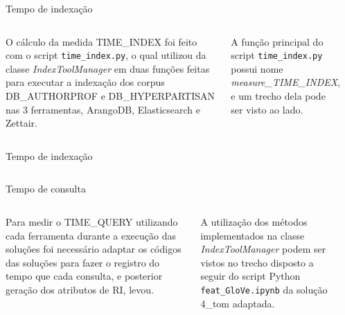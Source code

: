 \documentclass[%
  10pt,%
  aspectratio = 169,%
  compress,%
  t,%
]{beamer}%
\begin{document}
    \begin{frame}{}{Tempo de indexação}
        \begin{columns}
            O cálculo da medida TIME\_INDEX foi feito com o script \texttt{time\_index.py}, o qual utilizou da classe \textit{IndexToolManager} em duas funções feitas para executar a indexação dos corpus DB\_AUTHORPROF e DB\_HYPERPARTISAN nas 3 ferramentas, ArangoDB, Elasticsearch e Zettair.
            
            A função principal do script \texttt{time\_index.py} possui nome \textit{measure\_TIME\_INDEX}, e um trecho dela pode ser visto ao lado.

                \vspace{-1.0cm}
                \inputminted[bgcolor=bg, fontsize=\scriptsize,
                baselinestretch=1, tabsize=2, breaklines]{python}{codes/function-measure-TIME-INDEX.py}
        \end{columns}
    \end{frame}
    
    \begin{frame}{}{Tempo de indexação}
        \begin{columns}[T]
                \vspace{-0.5cm}
                
                \vspace{-0.5cm}
                
        \end{columns}
    \end{frame}
    
    \begin{frame}{}{Tempo de consulta}
        \begin{columns}
            Para medir o TIME\_QUERY utilizando cada ferramenta durante a execução das soluções foi necessário adaptar os códigos das soluções para fazer o registro do tempo que cada consulta, e posterior geração dos atributos de RI, levou.

			A utilização dos métodos implementados na classe \textit{IndexToolManager} podem ser vistos no trecho disposto a seguir do script Python \texttt{feat\_GloVe.ipynb} da solução 4\_tom adaptada.

                \vspace{-1.0cm}
                \inputminted[bgcolor=bg, fontsize=\scriptsize,
                baselinestretch=1, tabsize=1,obeytabs,showtabs, breaklines]{python}{codes/time-query-calculation-4-tom.py}
        \end{columns}
    \end{frame}
\end{document}
